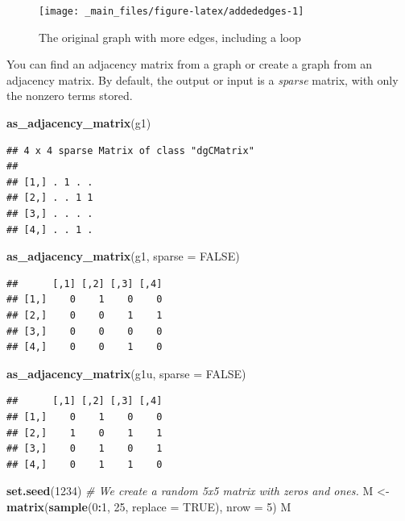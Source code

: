 \documentclass[
]{book}
\newenvironment{Shaded}{\begin{snugshade}}{\end{snugshade}}
\newcommand{\AttributeTok}[1]{\textcolor[rgb]{0.13,0.29,0.53}{#1}}
\newcommand{\CommentTok}[1]{\textcolor[rgb]{0.56,0.35,0.01}{\textit{#1}}}
\newcommand{\ConstantTok}[1]{\textcolor[rgb]{0.56,0.35,0.01}{#1}}
\newcommand{\DecValTok}[1]{\textcolor[rgb]{0.00,0.00,0.81}{#1}}
\newcommand{\FunctionTok}[1]{\textcolor[rgb]{0.13,0.29,0.53}{\textbf{#1}}}
\newcommand{\NormalTok}[1]{#1}
\newcommand{\OtherTok}[1]{\textcolor[rgb]{0.56,0.35,0.01}{#1}}
\newcommand{\SpecialCharTok}[1]{\textcolor[rgb]{0.81,0.36,0.00}{\textbf{#1}}}
\theoremstyle{definition}
\theoremstyle{definition}
\theoremstyle{definition}
\theoremstyle{definition}
\theoremstyle{remark}
\begin{document}
\begin{figure}
\texttt{[image: \_main\_files/figure-latex/addededges-1]} \caption{The original graph with more edges, including a loop}\label{fig:addededges}
\end{figure}

You can find an adjacency matrix from a graph or create a graph from an adjacency matrix. By default, the output or input is a \emph{sparse} matrix, with only the nonzero terms stored.

\begin{Shaded}
\begin{Highlighting}[]
\FunctionTok{as\_adjacency\_matrix}\NormalTok{(g1)}
\end{Highlighting}
\end{Shaded}

\begin{verbatim}
## 4 x 4 sparse Matrix of class "dgCMatrix"
##             
## [1,] . 1 . .
## [2,] . . 1 1
## [3,] . . . .
## [4,] . . 1 .
\end{verbatim}

\begin{Shaded}
\begin{Highlighting}[]
\FunctionTok{as\_adjacency\_matrix}\NormalTok{(g1, }\AttributeTok{sparse =} \ConstantTok{FALSE}\NormalTok{)}
\end{Highlighting}
\end{Shaded}

\begin{verbatim}
##      [,1] [,2] [,3] [,4]
## [1,]    0    1    0    0
## [2,]    0    0    1    1
## [3,]    0    0    0    0
## [4,]    0    0    1    0
\end{verbatim}

\begin{Shaded}
\begin{Highlighting}[]
\FunctionTok{as\_adjacency\_matrix}\NormalTok{(g1u, }\AttributeTok{sparse =} \ConstantTok{FALSE}\NormalTok{)}
\end{Highlighting}
\end{Shaded}

\begin{verbatim}
##      [,1] [,2] [,3] [,4]
## [1,]    0    1    0    0
## [2,]    1    0    1    1
## [3,]    0    1    0    1
## [4,]    0    1    1    0
\end{verbatim}

\begin{Shaded}
\begin{Highlighting}[]
\FunctionTok{set.seed}\NormalTok{(}\DecValTok{1234}\NormalTok{)}
\CommentTok{\# We create a random 5x5 matrix with zeros and ones.}
\NormalTok{M }\OtherTok{\textless{}{-}} \FunctionTok{matrix}\NormalTok{(}\FunctionTok{sample}\NormalTok{(}\DecValTok{0}\SpecialCharTok{:}\DecValTok{1}\NormalTok{, }\DecValTok{25}\NormalTok{, }\AttributeTok{replace =} \ConstantTok{TRUE}\NormalTok{), }\AttributeTok{nrow =} \DecValTok{5}\NormalTok{)}
\NormalTok{M}
\end{Highlighting}
\end{Shaded}
\end{document}
